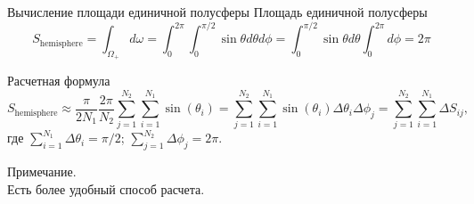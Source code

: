 \documentclass{beamer}
\begin{document}
	\begin{frame}{Вычисление площади единичной полусферы}
		Площадь единичной полусферы
		\[
			S_\text{hemisphere} 
			= 
			\int_{\Omega_+} d \omega 
			= 
			\int_{0}^{2\pi}\int_{0}^{\pi / 2} \sin \theta  d \theta d \phi
			= 
			\int_{0}^{\pi / 2} \sin \theta d \theta \int_{0}^{2\pi} d \phi
			=
			2 \pi
		\]


		Расчетная формула
		\[
			S_\text{hemisphere} 
			\approx
			\frac{\pi}{2 N_1}
			\frac{2 \pi}{N_2}
			\sum_{j=1}^{N_2} \sum_{i=1}^{N_1}
			\sin(\theta_i)
			=
			\sum_{j=1}^{N_2} \sum_{i=1}^{N_1}
			\sin(\theta_i) \Delta \theta_i \Delta \phi_j
			=
			\sum_{j=1}^{N_2} \sum_{i=1}^{N_1} \Delta S_{ij}
			,
		\]
		где 
		$\sum_{i=1}^{N_1} \Delta \theta_i = \pi /2$;
		$\sum_{j=1}^{N_2} \Delta \phi_j = 2 \pi$.

		\vspace{0.5cm}
		\footnotesize
		Примечание.\\
		Есть более удобный способ расчета.


	\end{frame}

\end{document}
